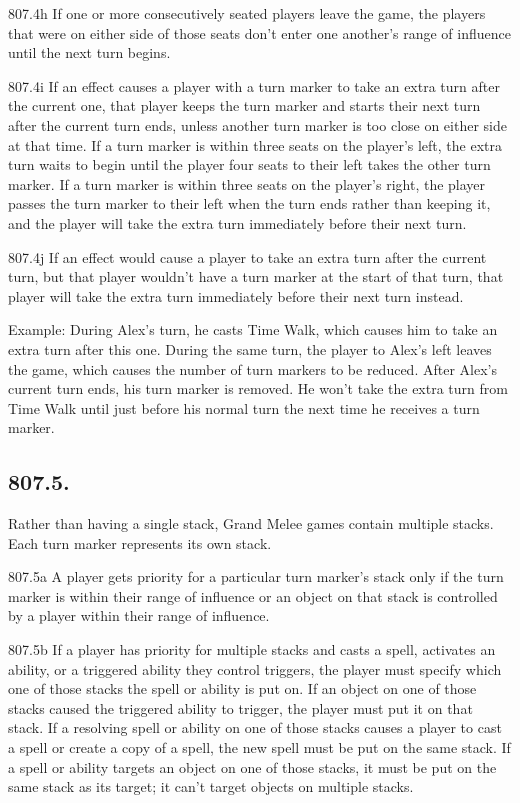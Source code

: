 807.4h If one or more consecutively seated players leave the game, the players that were on either side of those seats don’t enter one another’s range of influence until the next turn begins.

807.4i If an effect causes a player with a turn marker to take an extra turn after the current one, that player keeps the turn marker and starts their next turn after the current turn ends, unless another turn marker is too close on either side at that time. If a turn marker is within three seats on the player’s left, the extra turn waits to begin until the player four seats to their left takes the other turn marker. If a turn marker is within three seats on the player’s right, the player passes the turn marker to their left when the turn ends rather than keeping it, and the player will take the extra turn immediately before their next turn.

807.4j If an effect would cause a player to take an extra turn after the current turn, but that player wouldn’t have a turn marker at the start of that turn, that player will take the extra turn immediately before their next turn instead.

Example: During Alex’s turn, he casts Time Walk, which causes him to take an extra turn after this one. During the same turn, the player to Alex’s left leaves the game, which causes the number of turn markers to be reduced. After Alex’s current turn ends, his turn marker is removed. He won’t take the extra turn from Time Walk until just before his normal turn the next time he receives a turn marker.

\subsection*{807.5.}
Rather than having a single stack, Grand Melee games contain multiple stacks. Each turn marker represents its own stack.

807.5a A player gets priority for a particular turn marker’s stack only if the turn marker is within their range of influence or an object on that stack is controlled by a player within their range of influence.

807.5b If a player has priority for multiple stacks and casts a spell, activates an ability, or a triggered ability they control triggers, the player must specify which one of those stacks the spell or ability is put on. If an object on one of those stacks caused the triggered ability to trigger, the player must put it on that stack. If a resolving spell or ability on one of those stacks causes a player to cast a spell or create a copy of a spell, the new spell must be put on the same stack. If a spell or ability targets an object on one of those stacks, it must be put on the same stack as its target; it can’t target objects on multiple stacks.

